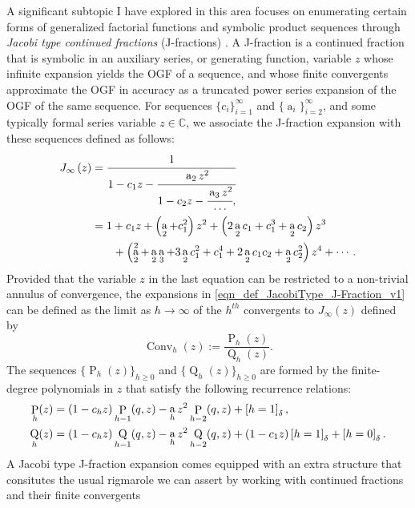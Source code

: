 \documentclass[12pt,reqno,a4letter]{article}
\numberwithin{figure}{section}
\numberwithin{table}{section}
\numberwithin{equation}{section}
\newcommand{\Iverson}[1]{\ensuremath{\left[#1\right]_{\delta}}}
\DeclareMathOperator{\ab}{a}
\DeclareMathOperator{\Conv}{Conv}
\DeclareMathOperator{\ConvP}{P}
\DeclareMathOperator{\ConvQ}{Q}
\theoremstyle{plain}
\numberwithin{theorem}{section}
\theoremstyle{definition}
\begin{document}
A significant subtopic I have explored in this area focuses on enumerating certain forms of 
generalized factorial functions and symbolic product sequences through 
\emph{Jacobi type continued fractions} (J-fractions) 
\cite{MDS-JNT-2017,MDS-RAMJ-CFRACS,MDS-JIS-V2-2017,MDS-INTEGERS-CFRACS-V1,MDS-INTEGERS-CFRACS-V2}. 
A J-fraction is a continued fraction that is symbolic in an auxiliary series, or generating function, 
variable $z$ whose infinite expansion yields the OGF of a sequence, and whose finite 
convergents approximate the OGF in accuracy as a 
truncated power series expansion of the OGF of the same sequence. 
For sequences 
$\{ c_i \}_{i=1}^{\infty}$ and $\{ \ab_i \}_{i=2}^{\infty}$, and 
some typically formal series variable $z \in \mathbb{C}$, 
we associate the J-fraction expansion with these 
sequences defined as follows: 
\begin{align} 
\label{eqn_def_JacobiType_J-Fraction_v1} 
J_{\infty}\left(z\right) 
     & = 
     \cfrac{1}{1-c_1z-\cfrac{\ab_2 z^2}{1-c_2z- 
     \cfrac{\ab_3 z^2}{\cdots},}} \\ 
\notag 
     & = 
     1 + c_1 z + \left(\ab_2+c_1^2\right) z^2 + 
     \left(2\ab_2 c_1+c_1^3+\ab_2 c_2\right) z^3 \\ 
\notag
     & \phantom{=1\ } + 
     \left(\ab_2^2+\ab_2\ab_3+3\ab_2 c_1^2 + c_1^4 + 2\ab_2 c_1c_2 + \ab_2 c_2^2 
     \right) z^4 + 
     \cdots. 
\end{align} 
Provided that the variable $z$ in the last equation can be restricted to a non-trivial 
annulus of convergence, the expansions in 
\eqref{eqn_def_JacobiType_J-Fraction_v1} can be defined as the limit as $h \rightarrow \infty$ 
of the $h^{th}$ convergents to $J_{\infty}(z)$ defined by 
\[
\Conv_h(z) := \frac{\ConvP_h(z)}{\ConvQ_h(z)}. 
\]
The sequences $\{\ConvP_h(z)\}_{h \geq 0}$ and $\{\ConvQ_h(z)\}_{h \geq 0}$ 
are formed by the finite-degree polynomials in $z$ that satisfy the following 
recurrence relations:
\begin{align} 
\label{eqn_ConvFn_PhzQhz_rdefs} 
\ConvP_h(z) & = (1-c_{h}  z) \ConvP_{h-1}(q, z) - 
     \ab_{h} z^2 \ConvP_{h-2}(q, z) + \Iverson{h = 1}, \\ 
\notag 
\ConvQ_h(z) & = (1-c_{h}  z) \ConvQ_{h-1}(q, z) - 
     \ab_{h} z^2 \ConvQ_{h-2}(q, z) + 
     (1-c_{1}  z) \Iverson{h = 1} + \Iverson{h = 0}. 
\end{align} 
A Jacobi type J-fraction expansion comes equipped with an extra structure 
that consitutes the usual rigmarole we 
can assert by working with continued fractions and their finite convergents 
\end{document}
